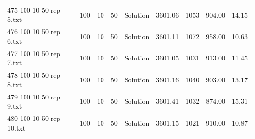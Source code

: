 \begin{longtable}{lrrllrrrr}
475 100 10 50 rep 5.txt & 100 & 10 & 50 & Solution & 3601.06 & 1053 & 904.00 & 14.15\\
476 100 10 50 rep 6.txt & 100 & 10 & 50 & Solution & 3601.11 & 1072 & 958.00 & 10.63\\
477 100 10 50 rep 7.txt & 100 & 10 & 50 & Solution & 3601.05 & 1031 & 913.00 & 11.45\\
478 100 10 50 rep 8.txt & 100 & 10 & 50 & Solution & 3601.16 & 1040 & 903.00 & 13.17\\
479 100 10 50 rep 9.txt & 100 & 10 & 50 & Solution & 3601.41 & 1032 & 874.00 & 15.31\\
480 100 10 50 rep 10.txt & 100 & 10 & 50 & Solution & 3601.15 & 1021 & 910.00 & 10.87\\
\end{longtable}

